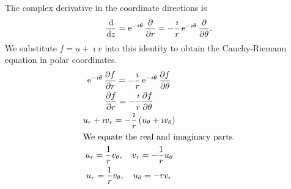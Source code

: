 {%
\begin{Solution}
  \label{solution diff polar coords}
  The complex derivative in the coordinate directions is
  \[
  \frac{\mathrm{d}}{\mathrm{d} z} = \mathop{\mathrm{e}}\nolimits^{- \imath \theta} \frac{\partial}{\partial r}
  = - \frac{\imath}{r} \mathop{\mathrm{e}}\nolimits^{- \imath \theta} \frac{\partial}{\partial \theta}.
  \]
  We substitute $f = u + \imath v$ into this identity to obtain the 
  Cauchy-Riemann equation in polar coordinates.
  \begin{gather*}
    \mathop{\mathrm{e}}\nolimits^{- \imath \theta} \frac{\partial f}{\partial r}
    = - \frac{\imath}{r} \mathop{\mathrm{e}}\nolimits^{- \imath \theta} \frac{\partial f}{\partial \theta} 
    \\
    \frac{\partial f}{\partial r} = - \frac{\imath}{r} \frac{\partial f}{\partial \theta} 
    \\
    u_r + \imath v_r = - \frac{\imath}{r} \left( u_\theta + \imath v_\theta \right) 
    \\
    \intertext{We equate the real and imaginary parts.}
    u_r = \frac{1}{r} v_\theta, \quad v_r = - \frac{1}{r} u_\theta 
    \\
    u_r = \frac{1}{r} v_\theta, \quad u_\theta = - r v_r
  \end{gather*}
\end{Solution}







}
